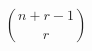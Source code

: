 \documentclass[12pt]{extbook}
\begin{document}
\begin{displaymath}
\binom{n+r-1}{r}
\end{displaymath}



 





 

 




% 

% 
\end{document}
